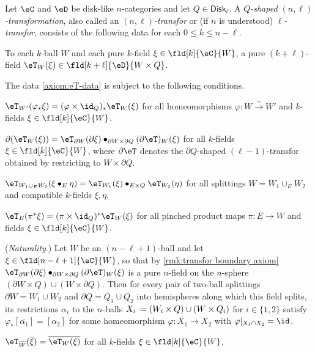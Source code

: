 \documentclass[12pt,reqno]{amsart}
\newcounter{alpha}\renewcommand\thealpha{\upshape\Alph{alpha}}
\newcommand{\Disk}{\mathsf{Disk}}
\newcommand{\C}{\eC}
\newcommand{\D}{\eD}
\newcommand{\blt}{\bullet}
\newcommand{\fcj}[1]{\overline{#1}}
\newcommand{\orev}{\overline}
\newcommand{\defn}[1]{\emph{#1}}
\DeclareRobustCommand{\coloneq}{\mathrel{\vcenter{\baselineskip0.5ex\lineskiplimit0pt\hbox{\scriptsize{\upshape.}}\hbox{\scriptsize{\upshape.}}}}=}
\begin{document}
\begin{definition}
  \label{def: DL k-transfor}
  Let $\C$ and $\D$ be disk-like $n$-categories and let $Q\in\Disk_\ell$.
  A \defn{$Q$-shaped $(n,\ell)$-transformation}, also called an \defn{$(n,\ell)$-transfor} or (if $n$ is understood) \defn{$\ell$-transfor}, consists of the following data for each $0\leq k\leq n-\ell$.
\begin{lst}
\item[(D$\eT$)]\label{axiom:eT-data}
To each $k$-ball $W$ and each pure $k$-field $\xi\in\fld[k]{\C}{W}$, a pure $(k+\ell)$-field $\eT_W(\xi)\in\fld[k+\ell]{\D}{W\times Q}$.
\end{lst}
The data \ref{axiom:eT-data} is subject to the following conditions.
  \begin{lst}
    \item[($\eT\varphi$)]\label{axiom:eT-nat}
    $\eT_{W'}(\varphi_*\xi) = (\varphi\times\id_Q)_*\eT_W(\xi)$ for all homeomorphisms $\varphi\colon W\xrightarrow{\sim}W'$ and $k$-fields $\xi\in\fld[k]{\C}{W}$.
    \item[($\eT\partial$)]\label{axiom:eT-boundary} 
    $\partial(\eT_W(\xi)) = \eT_{\partial W}(\partial \xi)\blt_{\partial W \times \partial Q}(\partial \eT)_W(\xi)$ for all $k$-fields $\xi\in\fld[k]{\C}{W}$, where $\partial \eT$ denotes the $\partial Q$-shaped $(\ell-1)$-transfor obtained by restricting to $W\times\partial Q$.

    \item[($\eT$G)]\label{axiom:eT-gluing} $\eT_{W_1\cup_E W_2}(\xi\blt_E \eta) = \eT_{W_1}(\xi)\blt_{E \times Q} \eT_{W_2}(\eta)$ for all splittings $W=W_1\cup_E W_2$ and compatible $k$-fields $\xi,\eta$.

    \item[($\eT\pi$)]\label{axiom:eT-products} $\eT_E(\pi^* \xi)=(\pi\times \id_Q)^* \eT_W(\xi)$ for all pinched product maps $\pi \colon E \to W$ and fields $\xi \in \fld[k]{\C}{W}$.

    \item[($\eT\kern0.2ex\Box$)]\label{axiom:eT-naturality}
    (\emph{Naturality}.) Let $W$ be an $(n{-}\ell{+}1)$-ball and let $\xi\in\fld[n-\ell+1]{\C}{W}$, so that by \cref{rmk:transfor boundary axiom} $\eT_{\partial W}(\partial \xi)\blt_{\partial W \times \partial Q}(\partial \eT)_W(\xi)$ is a pure $n$-field on the $n$-sphere $(\partial W\times Q)\cup(W\times\partial Q)$. Then for every pair of two-ball splittings $\partial W=W_1\cup W_2$ and $\partial Q=Q_1\cup Q_2$ into hemispheres along which this field splits, its restrictions $\alpha_i$ to the $n$-balls $X_i\coloneq(W_i\times Q)\cup(W\times Q_i)$ for $i\in\{1,2\}$ satisfy $\varphi_*[\fcj{\alpha_1}]=[\alpha_2]$ for some homeomorphism $\varphi\colon\orev{X_1}\to X_2$ with $\varphi|_{X_1\cap X_2}=\id$.
    \item[($\eT\kern.2ex\fcj{\,\cdot\,}$)]\label{axiom:eT-refl} 
    $\eT_{\orev{W}}(\fcj{\xi}) = \fcj{\eT_W(\xi)}$ for all $k$-fields $\xi\in\fld[k]{\C}{W}$.


\end{lst}
\end{definition}
\end{document}
